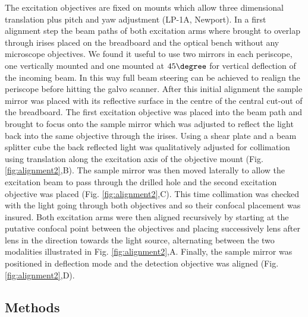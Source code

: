 \documentclass[12pt]{spieman}  %
\begin{document}
The excitation objectives are fixed on mounts which allow three dimensional translation plus pitch and yaw adjustment (LP-1A, Newport). In a first alignment step the beam paths of both excitation arms where brought to overlap through irises placed on the breadboard and the optical bench without any microscope objectives. We found it useful to use two mirrors in each periscope, one vertically mounted and one mounted at $45\degree$ for vertical deflection of the incoming beam. In this way full beam steering can be achieved to realign the periscope before hitting the galvo scanner. After this initial alignment the sample mirror was placed with its reflective surface in the centre of the central cut-out of the breadboard. The first excitation objective was placed into the beam path and brought to focus onto the sample mirror which was adjusted to reflect the light back into the same objective through the irises. Using a shear plate and a beam splitter cube the back reflected light was qualitatively adjusted for collimation using translation along the excitation axis of the objective mount (Fig. \ref{fig:alignment2},B). The sample mirror was then moved laterally to allow the excitation beam to pass through the drilled hole and the second excitation objective was placed (Fig. \ref{fig:alignment2},C). This time collimation was checked with the light going through both objectives and so their confocal placement was insured. Both excitation arms were then aligned recursively by starting at the putative confocal point between the objectives and placing successively lens after lens in the direction towards the light source, alternating between the two modalities illustrated in Fig. \ref{fig:alignment2},A. Finally, the sample mirror was positioned in deflection mode and the detection objective was aligned (Fig. \ref{fig:alignment2},D). 

\subsection{Methods}
\end{document}
